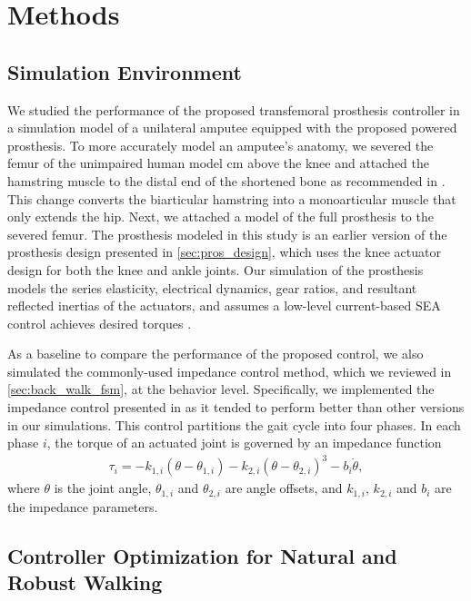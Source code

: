 \section{Methods}
\subsection{Simulation Environment}\label{sec:complete_simulation_environ}

We studied the performance of the proposed transfemoral prosthesis controller in
a simulation model of a unilateral amputee equipped with the proposed powered
prosthesis. To more accurately model an amputee's anatomy, we severed the femur
of the unimpaired human model \unit[11]{cm} above the knee and attached the
hamstring muscle to the distal end of the shortened bone as recommended in
\citet{brown2012amputation}. This change converts the biarticular hamstring into
a monoarticular muscle that only extends the hip. Next, we attached a model of
the full prosthesis to the severed femur. The prosthesis modeled in this study
is an earlier version of the prosthesis design presented in
\cref{sec:pros_design}, which uses the knee actuator design for both the knee
and ankle joints. Our simulation of the prosthesis models the series elasticity,
electrical dynamics, gear ratios, and resultant reflected inertias of the
actuators, and assumes a low-level current-based SEA control achieves desired
torques \citep{pratt1995series}.

As a baseline to compare the performance of the proposed control, we also
simulated the commonly-used impedance control method, which we reviewed in
\cref{sec:back_walk_fsm}, at the behavior level.  Specifically, we implemented
the impedance control presented in \citet{sup2008design} as it tended to perform
better than other versions in our simulations. This control partitions the gait
cycle into four phases. In each phase $i$, the torque of an actuated joint is
governed by an impedance function
\begin{align} 
    \tau_i = -k_{1,i} (\theta - \theta_{1,i}) - k_{2,i} 
        {(\theta - \theta_{2,i})}^3 - b_i \dot{\theta}, 
\end{align} 
where $\theta$ is the joint angle, $\theta_{1,i}$ and $\theta_{2,i}$ are angle
offsets, and $k_{1,i}$, $k_{2,i}$ and $b_i$ are the impedance parameters.  

\subsection{Controller Optimization for Natural and Robust
Walking}\label{sec:completed_comparison_opt}

